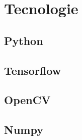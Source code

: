 \section{Tecnologie}
\subsection{Python}
\subsection{Tensorflow}
\subsection{OpenCV}
\subsection{Numpy}